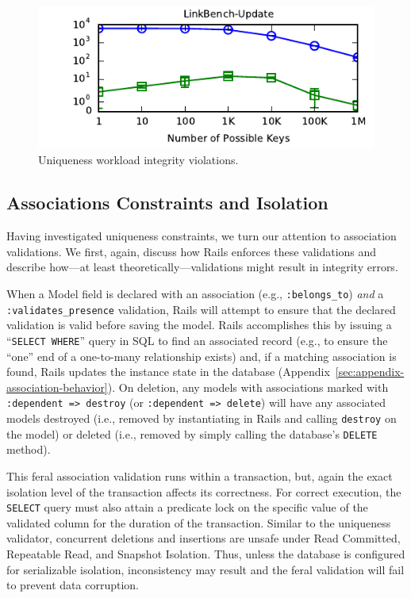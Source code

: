 \begin{figure}
\begin{minipage}{\columnwidth}
\includegraphics[width=1\columnwidth]{figs/pk-workload-linkbench-upd-violations.pdf}\vspace{-1em}
\end{minipage}
\caption{Uniqueness workload integrity violations.}
\label{fig:pk-workload}
\end{figure}


\subsection{Associations Constraints and Isolation}

Having investigated uniqueness constraints, we turn our attention to
association validations. We first, again, discuss how Rails enforces
these validations and describe how---at least
theoretically---validations might result in integrity errors.

When a Model field is declared with an association (e.g.,
\texttt{:belongs\_to}) \textit{and} a \texttt{:validates\_presence}
validation, Rails will attempt to ensure that the declared validation
is valid before saving the model. Rails accomplishes this by issuing a
``\texttt{SELECT WHERE}'' query in SQL to find an associated record (e.g.,
to ensure the ``one'' end of a one-to-many relationship exists) and, if a
matching association is found, Rails updates the instance state in the
database (Appendix~\ref{sec:appendix-association-behavior}). On
deletion, any models with associations marked with \texttt{:dependent =>
  destroy} (or \texttt{:dependent  => delete}) will have any associated
models destroyed (i.e., removed by instantiating in Rails and calling
\texttt{destroy} on the model) or deleted (i.e., removed by simply
calling the database's \texttt{DELETE} method). 

This feral association validation runs within a transaction, but,
again the exact isolation level of the transaction affects its
correctness. For correct execution, the \texttt{SELECT} query must
also attain a predicate lock on the specific value of the validated
column for the duration of the transaction. Similar to the uniqueness
validator, concurrent deletions and insertions are unsafe under Read
Committed, Repeatable Read, and Snapshot Isolation. Thus, unless the
database is configured for serializable isolation, inconsistency may
result and the feral validation will fail to prevent data corruption.

